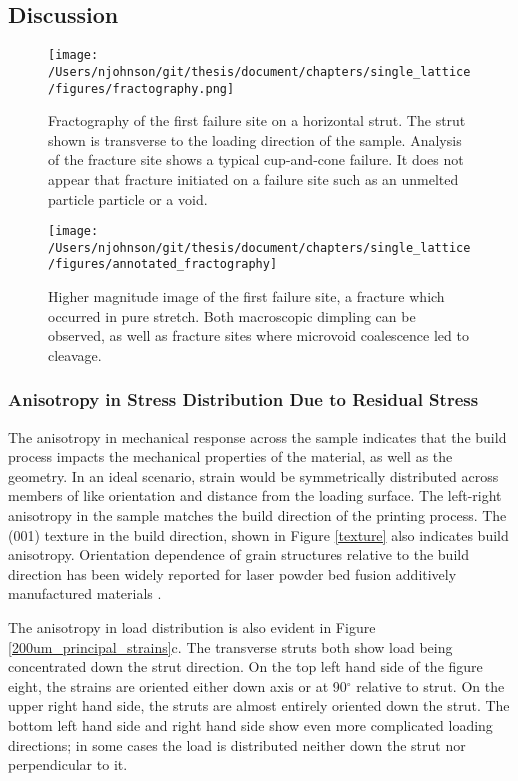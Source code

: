 \subsection{Discussion}

\begin{figure*}
	\texttt{[image: /Users/njohnson/git/thesis/document/chapters/single\_lattice/figures/fractography.png]}
	\caption{Fractography of the first failure site on a horizontal strut. The strut shown is transverse to the loading direction of the sample. Analysis of the fracture site shows a typical cup-and-cone failure. It does not appear that fracture initiated on a failure site such as an unmelted particle particle or a void.}
	\label{fractography}
\end{figure*}

\begin{figure*}
	\texttt{[image: /Users/njohnson/git/thesis/document/chapters/single\_lattice/figures/annotated\_fractography]}
	\caption{Higher magnitude image of the first failure site, a fracture which occurred in pure stretch. Both macroscopic dimpling can be observed, as well as fracture sites where microvoid coalescence led to cleavage.}
	\label{annofrac}
\end{figure*}

\subsubsection{Anisotropy in Stress Distribution Due to Residual Stress}
The anisotropy in mechanical response across the sample indicates that the build process impacts the mechanical properties of the material, as well as the geometry. In an ideal scenario, strain would be symmetrically distributed across members of like orientation and distance from the loading surface. The left-right anisotropy in the sample matches the build direction of the printing process. The (001) texture in the build direction, shown in Figure \ref{texture} also indicates build anisotropy. Orientation dependence of grain structures relative to the build direction has been widely reported for laser powder bed fusion additively manufactured materials \cite{Hayes2017,Keist2020, Todaro2020}.

The anisotropy in load distribution is also evident in Figure \ref{200um_principal_strains}c. The transverse struts both show load being concentrated down the strut direction. On the top left hand side of the figure eight, the strains are oriented either down axis or at 90$^\circ$ relative to strut. On the upper right hand side, the struts are almost entirely oriented down the strut. The bottom left hand side and right hand side show even more complicated loading directions; in some cases the load is distributed neither down the strut nor perpendicular to it. 

